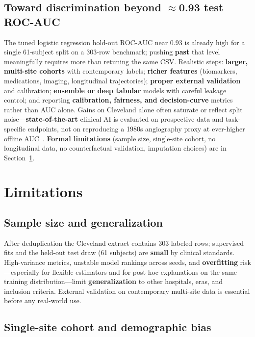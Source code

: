 \documentclass[11pt,a4paper]{article}
\begin{document}
\subsection{Toward discrimination beyond $\approx$\num{0.93} test ROC-AUC}

The tuned logistic regression hold-out ROC-AUC near \num{0.93} is already high for a single \num{61}-subject split on a \num{303}-row benchmark; pushing \textbf{past} that level meaningfully requires more than retuning the same CSV. Realistic steps: \textbf{larger, multi-site cohorts} with contemporary labels; \textbf{richer features} (biomarkers, medications, imaging, longitudinal trajectories); \textbf{proper external validation} and calibration; \textbf{ensemble or deep tabular} models with careful leakage control; and reporting \textbf{calibration, fairness, and decision-curve} metrics rather than AUC alone. Gains on Cleveland alone often saturate or reflect split noise—\textbf{state-of-the-art} clinical AI is evaluated on prospective data and task-specific endpoints, not on reproducing a 1980s angiography proxy at ever-higher offline AUC~\cite{detrano}. \textbf{Formal limitations} (sample size, single-site cohort, no longitudinal data, no counterfactual validation, imputation choices) are in Section~\ref{sec:limitations}.

\section{Limitations}
\label{sec:limitations}

\subsection{Sample size and generalization}

After deduplication the Cleveland extract contains \num{303} labeled rows; supervised fits and the held-out test draw (\num{61} subjects) are \textbf{small} by clinical standards. High-variance metrics, unstable model rankings across seeds, and \textbf{overfitting} risk—especially for flexible estimators and for post-hoc explanations on the same training distribution—limit \textbf{generalization} to other hospitals, eras, and inclusion criteria. External validation on contemporary multi-site data is essential before any real-world use.

\subsection{Single-site cohort and demographic bias}
\end{document}
